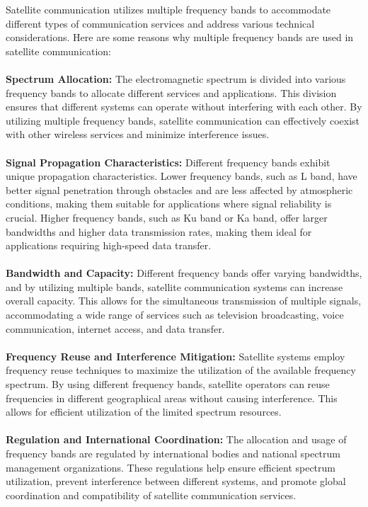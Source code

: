 \noindent Satellite communication utilizes multiple frequency bands to accommodate different types of communication services and address various technical considerations. Here are some reasons why multiple frequency bands are used in satellite communication:
\\
\\
\textbf{Spectrum Allocation:} The electromagnetic spectrum is divided into various frequency bands to allocate different services and applications. This division ensures that different systems can operate without interfering with each other. By utilizing multiple frequency bands, satellite communication can effectively coexist with other wireless services and minimize interference issues.
\\
\\
\textbf{Signal Propagation Characteristics:} Different frequency bands exhibit unique propagation characteristics. Lower frequency bands, such as L band, have better signal penetration through obstacles and are less affected by atmospheric conditions, making them suitable for applications where signal reliability is crucial. Higher frequency bands, such as Ku band or Ka band, offer larger bandwidths and higher data transmission rates, making them ideal for applications requiring high-speed data transfer.
\\
\\
\textbf{Bandwidth and Capacity:} Different frequency bands offer varying bandwidths, and by utilizing multiple bands, satellite communication systems can increase overall capacity. This allows for the simultaneous transmission of multiple signals, accommodating a wide range of services such as television broadcasting, voice communication, internet access, and data transfer.
\\
\\
\textbf{Frequency Reuse and Interference Mitigation:} Satellite systems employ frequency reuse techniques to maximize the utilization of the available frequency spectrum. By using different frequency bands, satellite operators can reuse frequencies in different geographical areas without causing interference. This allows for efficient utilization of the limited spectrum resources.
\\
\\
\textbf{Regulation and International Coordination:} The allocation and usage of frequency bands are regulated by international bodies and national spectrum management organizations. These regulations help ensure efficient spectrum utilization, prevent interference between different systems, and promote global coordination and compatibility of satellite communication services.
